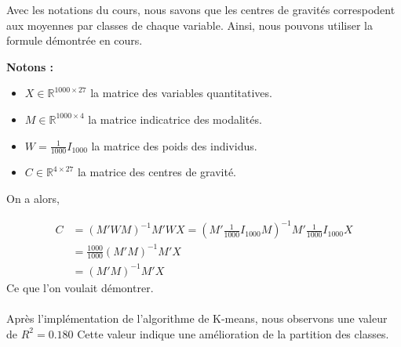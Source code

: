\documentclass{article}
\begin{document}
Avec les notations du cours, nous savons que les centres de gravités correspodent aux moyennes par classes de chaque variable. Ainsi, nous pouvons utiliser la formule démontrée en cours.
\par\textbf{Notons :}
\begin{itemize}
    \item $X \in \mathbb{R}^{1000\times 27}$ la matrice des variables quantitatives.
    \item $M \in \mathbb{R}^{1000\times 4}$ la matrice indicatrice des modalités.
    \item $W = \frac{1}{1000} I_{1000}$ la matrice des poids des individus.
    \item $C \in \mathbb{R}^{4\times 27}$ la matrice des centres de gravité.
\end{itemize}

On a alors, 

\begin{align*}
    C &= (M'WM)^{-1}M'WX = (M'\frac{1}{1000} I_{1000} M)^{-1}M' \frac{1}{1000} I_{1000} X \\
    &=\frac{1000}{1000}(M'M)^{-1} M'X \\
    &= (M'M)^{-1} M'X
\end{align*}
Ce que l'on voulait démontrer.
\\
\\
Après l'implémentation de l'algorithme de K-means, nous observons une valeur de $R^2=0.180$ Cette valeur indique une amélioration de la partition des classes.
\end{document}
